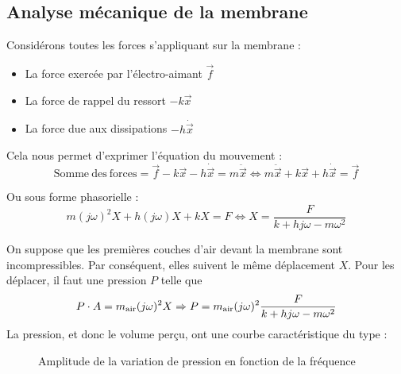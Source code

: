 \subsection[b]{Analyse mécanique de la membrane}
Considérons toutes les forces s'appliquant sur la membrane :
\begin{itemize}
\item La force exercée par l'électro-aimant $ \vec{f} $ 
\item La force de rappel du ressort $ - k \vec{x} $
\item La force due aux dissipations $ - h \dot{\vec{x}} $
\end{itemize}

Cela nous permet d'exprimer l'équation du mouvement :
\begin{equation}
\mathrm{Somme\ des\ forces} = \vec{f} - k \vec{x} - h \dot{\vec{x}} = m \ddot{\vec{x}}
\Leftrightarrow m \ddot{\vec{x}} + k \vec{x} + h \dot{\vec{x}} = \vec{f}
\end{equation}

Ou sous forme phasorielle :
\begin{equation}
m (j\omega)^2 X+ h (j\omega)X + kX = F
\Leftrightarrow X = \frac{F}{k + hj\omega - m {\omega}^2}
\end{equation}

On suppose que les premières couches d’air devant la membrane sont incompressibles. Par conséquent, elles suivent le même déplacement $X$.
Pour les déplacer, il faut une pression $P$ telle que 
\begin{equation}
P\cdot A = m_{\mathrm{air}} (j \omega)^2X
\Rightarrow P = m_{\mathrm{air}} (j \omega)^2 \frac{F}{k+hj \omega -m \omega^2}
\end{equation}
La pression, et donc le volume perçu, ont une courbe caractéristique du type :

\begin{figure}[h!]
    \centering
    \caption{Amplitude de la variation de pression en fonction de la fréquence}
\end{figure}

